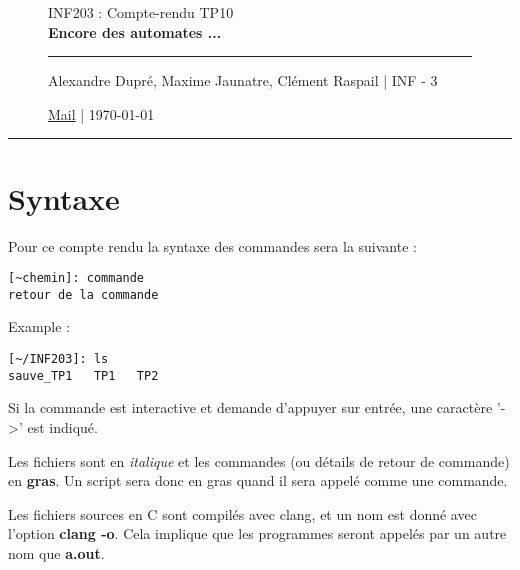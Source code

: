 \documentclass[12pt,a4paper,notitlepage,colorinlistoftodos]{article}
\begin{document}
\begin{figure}
    \begin{minipage}{.75\textwidth}
    \begin{center}
    {\Large INF203 : Compte-rendu TP10 \\ \textbf{Encore des automates ...}}
    \end{center}
    \rule{7em}{.4pt}\par
     Alexandre Dupré, Maxime Jaunatre, Clément Raspail | INF - 3 \par 
     \href{mailto:alexandre.dupre@etu.univ-grenoble-alpes.fr,maxime.jaunatre@etu.univ-grenoble-alpes.fr, clement.raspail@etu.univ-grenoble-alpes.fr}{Mail} | \today
\end{minipage}
\end{figure}

\hrule

\section*{Syntaxe}

\iffalse
 Alexandre Dupré <alexandre.dupre@etu.univ-grenoble-alpes.fr>
 Maxime Jaunatre <maxime.jaunatre@etu.univ-grenoble-alpes.fr> 
 Clément Raspail <clement.raspail@etu.univ-grenoble-alpes.fr>
\fi

Pour ce compte rendu la syntaxe des commandes sera la suivante :
\begin{lstlisting}
[~chemin]: commande
retour de la commande
\end{lstlisting}

Example :
\begin{lstlisting}
[~/INF203]: ls
sauve_TP1   TP1   TP2
\end{lstlisting}

Si la commande est interactive et demande d'appuyer  sur entrée, une caractère '->' est indiqué.

Les fichiers sont en \textit{italique} et les commandes (ou détails de retour de commande) en \textbf{gras}. Un script sera donc en gras quand il sera appelé comme une commande.


Les fichiers sources en C sont compilés avec clang, et un nom est donné avec l'option \textbf{clang -o}. Cela implique que les programmes seront appelés par un autre nom que \textbf{a.out}.
\end{document}
